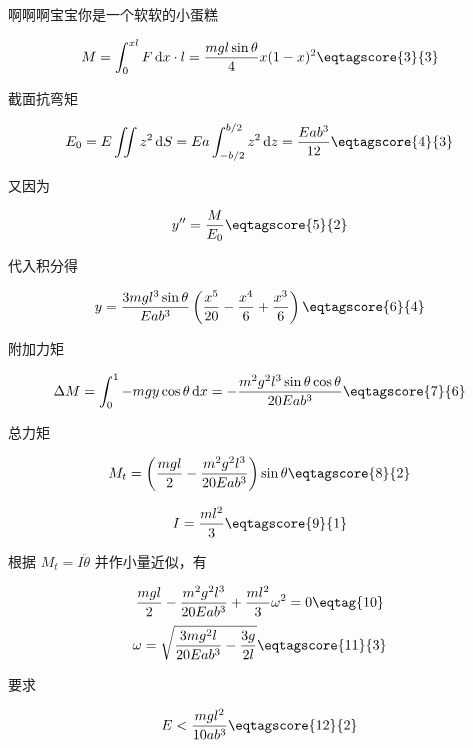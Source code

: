 \documentclass[answer]{cphos}
\begin{document}
\begin{problem}[40]{啊啊啊宝宝你是一个软软的小蛋糕}
\begin{solution}
\begin{equation}
	M=\int_0^{xl}F\,\mathrm{d}x\cdot l=\frac{mgl\sin\theta}{4}x(1-x)^2 \eqtagscore{3}{3}
\end{equation}

截面抗弯矩

\begin{equation}
	E_0=E\iint z^2\,\mathrm{d}S=Ea\int_{-b/2}^{b/2}z^2\,\mathrm{d}z=\frac{Eab^3}{12} \eqtagscore{4}{3}
\end{equation}

又因为

\begin{equation}
	y''=\frac{M}{E_0} \eqtagscore{5}{2}
\end{equation}

代入积分得

\begin{equation}
	y=\frac{3mgl^3\sin\theta}{Eab^3}\left(\frac{x^5}{20}-\frac{x^4}{6}+\frac{x^3}{6}\right) \eqtagscore{6}{4}
\end{equation}

附加力矩

\begin{equation}
	\Delta M=\int_0^1-mgy\cos\theta \,\mathrm{d}x=-\frac{m^2g^2l^3\sin\theta\cos\theta}{20Eab^3} \eqtagscore{7}{6}
\end{equation}

总力矩

\begin{equation}
 M_t=\left(\frac{mgl}{2}-\frac{m^2g^2l^3}{20Eab^3}\right)\sin\theta\eqtagscore{8}{2}
\end{equation}

\begin{equation}
	I=\frac{ml^2}{3}\eqtagscore{9}{1}
\end{equation}

根据 $M_t=I\ddot\theta$ 并作小量近似，有

\begin{equation}
	\frac{mgl}{2}-\frac{m^2g^2l^3}{20Eab^3}+\frac{ml^2}{3}\omega^2=0 \eqtag{10}
\end{equation}
\begin{equation}
	\omega=\sqrt{\frac{3mg^2l}{20Eab^3}-\frac{3g}{2l}} \eqtagscore{11}{3}
\end{equation}

要求

\begin{equation}
	E<\frac{mgl^2}{10ab^3}\eqtagscore{12}{2}
\end{equation}


\end{solution}
\end{problem}
\end{document}
